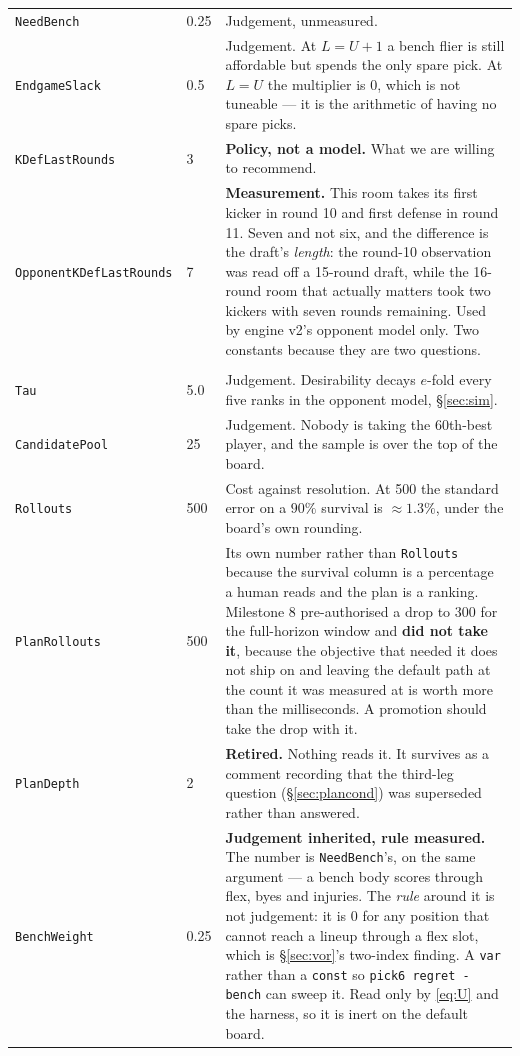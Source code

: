 \documentclass[10pt,a4paper]{article}
\theoremstyle{plain}
\theoremstyle{definition}
\theoremstyle{remark}
\newcommand{\code}[1]{\texttt{\small #1}}
\begin{document}
\begin{longtable}{@{}p{}p{}p{}@{}}
\code{NeedBench} & 0.25 & Judgement, unmeasured. \\
\code{EndgameSlack} & 0.5 & Judgement. At $L = U+1$ a bench flier is still affordable but spends the only spare pick. At $L = U$ the multiplier is $0$, which is not tuneable --- it is the arithmetic of having no spare picks. \\
\code{KDefLastRounds} & 3 & \textbf{Policy, not a model.} What we are willing to recommend. \\
\code{OpponentKDefLastRounds} & 7 & \textbf{Measurement.} This room takes its first kicker in round 10 and first defense in round 11. Seven and not six, and the difference is the draft's \emph{length}: the round-10 observation was read off a 15-round draft, while the 16-round room that actually matters took two kickers with seven rounds remaining. Used by engine v2's opponent model only. Two constants because they are two questions. \\
\addlinespace
\multicolumn{3}{@{}l}{\emph{Simulation and the plan --- \code{engine/tuning.go}}}\\[0.2em]
\code{Tau} & 5.0 & Judgement. Desirability decays $e$-fold every five ranks in the opponent model, \S\ref{sec:sim}. \\
\code{CandidatePool} & 25 & Judgement. Nobody is taking the 60th-best player, and the sample is over the top of the board. \\
\code{Rollouts} & 500 & Cost against resolution. At 500 the standard error on a $90\%$ survival is $\approx 1.3\%$, under the board's own rounding. \\
\code{PlanRollouts} & 500 & Its own number rather than \code{Rollouts} because the survival column is a percentage a human reads and the plan is a ranking. Milestone 8 pre-authorised a drop to 300 for the full-horizon window and \textbf{did not take it}, because the objective that needed it does not ship on and leaving the default path at the count it was measured at is worth more than the milliseconds. A promotion should take the drop with it. \\
\code{PlanDepth} & 2 & \textbf{Retired.} Nothing reads it. It survives as a comment recording that the third-leg question (\S\ref{sec:plancond}) was superseded rather than answered. \\
\code{BenchWeight} & 0.25 & \textbf{Judgement inherited, rule measured.} The number is \code{NeedBench}'s, on the same argument --- a bench body scores through flex, byes and injuries. The \emph{rule} around it is not judgement: it is $0$ for any position that cannot reach a lineup through a flex slot, which is \S\ref{sec:vor}'s two-index finding. A \code{var} rather than a \code{const} so \code{pick6 regret -bench} can sweep it. Read only by \eqref{eq:U} and the harness, so it is inert on the default board. \\

\end{longtable}
\end{document}
